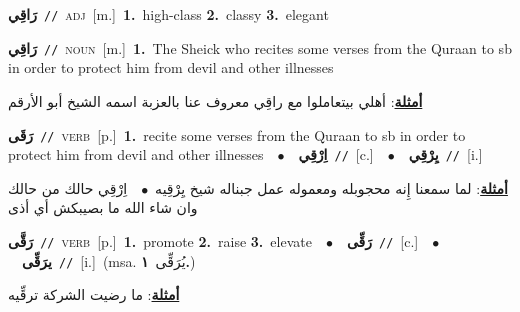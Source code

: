 \documentclass[10pt,a4paper,twoside]{article} %
\begin{document}
\begin{multicols}{2}
{\setlength\topsep{0pt}\textbf{\foreignlanguage{arabic}{رَاقِي}}\ {\color{gray}\texttt{//}\color{black}}\ \textsc{adj}\ [m.]\ \textbf{1.}~high-class  \textbf{2.}~classy  \textbf{3.}~elegant\ } \vspace{2mm}

{\setlength\topsep{0pt}\textbf{\foreignlanguage{arabic}{رَاقِي}}\ {\color{gray}\texttt{//}\color{black}}\ \textsc{noun}\ [m.]\ \textbf{1.}~The Sheick who recites some verses from the Quraan to sb in order to protect him from devil and other illnesses\  \begin{flushright}\color{gray}\foreignlanguage{arabic}{\textbf{\underline{\foreignlanguage{arabic}{أمثلة}}}: أهلي بيتعاملوا مع راقِي معروف عنا بالعزبة اسمه الشيخ أبو الأرقم}\end{flushright}\color{black}} \vspace{2mm}

{\setlength\topsep{0pt}\textbf{\foreignlanguage{arabic}{رَقَى}}\ {\color{gray}\texttt{//}\color{black}}\ \textsc{verb}\ [p.]\ \textbf{1.}~recite some verses from the Quraan to sb in order to protect him from devil and other illnesses\ \ $\bullet$\ \ \setlength\topsep{0pt}\textbf{\foreignlanguage{arabic}{اِرْقِي}}\ {\color{gray}\texttt{//}\color{black}}\ [c.]\ \ $\bullet$\ \ \setlength\topsep{0pt}\textbf{\foreignlanguage{arabic}{يِرْقِي}}\ {\color{gray}\texttt{//}\color{black}}\ [i.]\  \begin{flushright}\color{gray}\foreignlanguage{arabic}{\textbf{\underline{\foreignlanguage{arabic}{أمثلة}}}: لما سمعنا إِنه محجوبله ومعموله عمل جبناله شيخ يِرْقِيه\ $\bullet$\ \  اِرْقِي حالك من حالك وان شاء الله ما بصيبكش أي أذى}\end{flushright}\color{black}} \vspace{2mm}

{\setlength\topsep{0pt}\textbf{\foreignlanguage{arabic}{رَقَّى}}\ {\color{gray}\texttt{//}\color{black}}\ \textsc{verb}\ [p.]\ \textbf{1.}~promote  \textbf{2.}~raise  \textbf{3.}~elevate\ \ $\bullet$\ \ \setlength\topsep{0pt}\textbf{\foreignlanguage{arabic}{رَقِّى}}\ {\color{gray}\texttt{//}\color{black}}\ [c.]\ \ $\bullet$\ \ \setlength\topsep{0pt}\textbf{\foreignlanguage{arabic}{يرَقِّى}}\ {\color{gray}\texttt{//}\color{black}}\ [i.]\ \color{gray}(msa. \foreignlanguage{arabic}{يُرَقِّى}~\foreignlanguage{arabic}{\textbf{١.}})\color{black}\  \begin{flushright}\color{gray}\foreignlanguage{arabic}{\textbf{\underline{\foreignlanguage{arabic}{أمثلة}}}: ما رضيت الشركة ترقِّيه}\end{flushright}\color{black}} \vspace{2mm}


\end{multicols}
\end{document}
